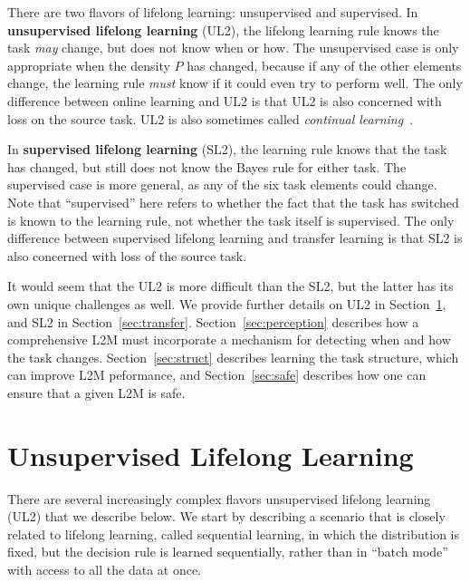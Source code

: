 \documentclass{article}
\begin{document}
There are two flavors of lifelong learning: unsupervised and supervised. 
In \textbf{unsupervised lifelong learning} (UL2), the lifelong learning rule knows the task \emph{may} change, but does not know when or how. The unsupervised case is only appropriate when the density $P$ has changed, because if any of the other elements change, the learning rule \emph{must} know if it could even try to perform well. 
The only difference between online learning and UL2 is that UL2 is also concerned with loss on the source task. UL2 is also sometimes called \emph{continual learning}~\cite{noauthor_undated-cl}.


In \textbf{supervised lifelong learning} (SL2), the learning rule knows that the task has changed, but still does not know  the Bayes rule for either task.  The supervised case is more general, as any of the six task elements could change. Note that ``supervised'' here refers to whether the fact that the task has switched is known to the learning rule, not whether the task itself is supervised.  The only difference between supervised lifelong learning and transfer learning is that SL2 is also concerned with loss of the source task. 



It would seem that the UL2 is more difficult than the SL2, but the latter has its own unique challenges as well. We provide further details on UL2  in Section~\ref{sec:continual}, and SL2 in Section~\ref{sec:transfer}.  
Section~\ref{sec:perception} describes how a comprehensive L2M must incorporate a mechanism for detecting when and how the task changes.  Section~\ref{sec:struct} describes learning the task structure, which can improve L2M peformance, and Section~\ref{sec:safe} describes how one can ensure that a given L2M is safe.  



 







\section{Unsupervised Lifelong Learning}
\label{sec:continual}

There are several increasingly complex flavors unsupervised lifelong learning (UL2) that we describe below.  We start by describing a scenario that is closely related to lifelong learning, called sequential learning, in which the distribution is fixed, but the decision rule is learned sequentially, rather than in ``batch mode'' with access to all the data at once. 
\end{document}
